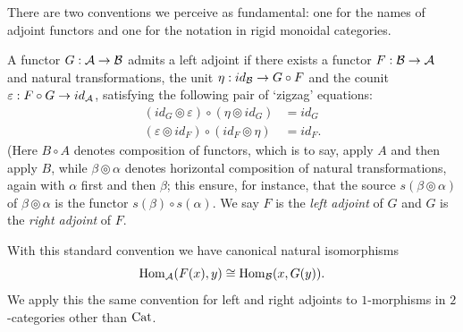 \documentclass{amsart}
\begin{document}
There are two conventions we perceive as fundamental: one for the names of adjoint functors and one for the notation in rigid monoidal categories. 

\begin{definition} \label{def:Adjoints}
	A functor $G: \mathcal A \to \mathcal B$  admits a left adjoint if there exists a functor $F: \mathcal B \to \mathcal A$ and natural transformations, the  unit $\eta: id_{\mathcal B} \to G \circ F$ and the  counit $\varepsilon: F \circ G \to id_{\mathcal A}$, satisfying the following pair of `zigzag' equations:
	\begin{align*}
		(id_{G} \circledcirc \varepsilon  ) \circ (  \eta \circledcirc id_{G}) &= id_{G} \\
		(\varepsilon \circledcirc id_{F}) \circ (id_{F} \circledcirc \eta) &= id_{F}.
	\end{align*}
(Here $B \circ A$ denotes composition of functors, which is to say, apply $A$ and then apply $B$, while $\beta \circledcirc \alpha$ denotes horizontal composition of natural transformations, again with $\alpha$ first and then $\beta$; this ensure, for instance, that the source $s(\beta \circledcirc \alpha)$ of $\beta \circledcirc \alpha$ is the functor $s(\beta) \circ s(\alpha)$.  We say $F$ is the {\em left adjoint} of $G$ and $G$ is the {\em right adjoint} of $F$.
\end{definition}

\nid With this standard convention we have canonical natural isomorphisms
\begin{equation*}
	\operatorname{Hom}_\mathcal A(F(x), y) \cong \operatorname{Hom}_\mathcal B(x, G(y)).
\end{equation*}
We apply this the same convention for left and right adjoints to $1$-morphisms in $2$-categories other than $\mathrm{Cat}$.
\end{document}
